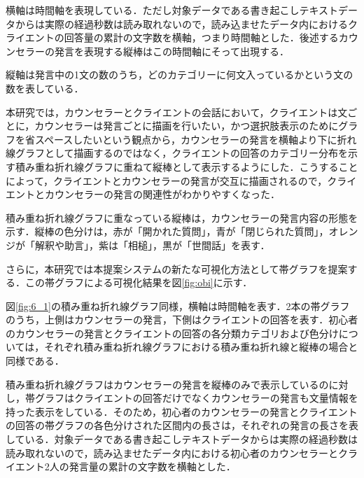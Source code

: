 \documentclass[shuuron]{kuee}
\begin{document}
横軸は時間軸を表現している．ただし対象データである書き起こしテキストデータからは実際の経過秒数は読み取れないので，読み込ませたデータ内におけるクライエントの回答量の累計の文字数を横軸，つまり時間軸とした．後述するカウンセラーの発言を表現する縦棒はこの時間軸にそって出現する．

縦軸は発言中の1文の数のうち，どのカテゴリーに何文入っているかという文の数を表している．



本研究では，カウンセラーとクライエントの会話において，クライエントは文ごとに，カウンセラーは発言ごとに描画を行いたい，かつ選択肢表示のためにグラフを省スペースしたいという観点から，カウンセラーの発言を横軸より下に折れ線グラフとして描画するのではなく，クライエントの回答のカテゴリー分布を示す積み重ね折れ線グラフに重ねて縦棒として表示するようにした．こうすることによって，クライエントとカウンセラーの発言が交互に描画されるので，クライエントとカウンセラーの発言の関連性がわかりやすくなった．

積み重ね折れ線グラフに重なっている縦棒は，カウンセラーの発言内容の形態を示す．縦棒の色分けは，赤が「開かれた質問」，青が「閉じられた質問」，オレンジが「解釈や助言」，紫は「相槌」，黒が「世間話」を表す．





さらに，本研究では本提案システムの新たな可視化方法として帯グラフを提案する．この帯グラフによる可視化結果を図\ref{fig:obi}に示す．

図\ref{fig:6_1}の積み重ね折れ線グラフ同様，横軸は時間軸を表す．2本の帯グラフのうち，上側はカウンセラーの発言，下側はクライエントの回答を表す．初心者のカウンセラーの発言とクライエントの回答の各分類カテゴリおよび色分けについては，それぞれ積み重ね折れ線グラフにおける積み重ね折れ線と縦棒の場合と同様である．

積み重ね折れ線グラフはカウンセラーの発言を縦棒のみで表示しているのに対し，帯グラフはクライエントの回答だけでなくカウンセラーの発言も文量情報を持った表示をしている．そのため，初心者のカウンセラーの発言とクライエントの回答の帯グラフの各色分けされた区間内の長さは，それぞれの発言の長さを表している．対象データである書き起こしテキストデータからは実際の経過秒数は読み取れないので，読み込ませたデータ内における初心者のカウンセラーとクライエント2人の発言量の累計の文字数を横軸とした．
\end{document}
